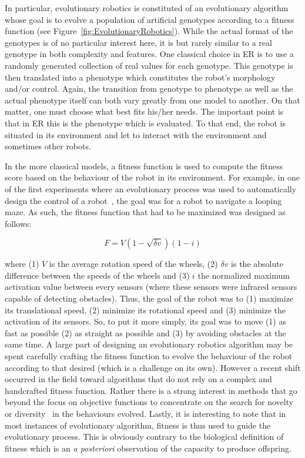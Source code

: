     In particular, evolutionary robotics is constituted of an evolutionary algorithm whose goal is to evolve a population of artificial genotypes according to a fitness function (see Figure~\ref{fig:EvolutionaryRobotics}). While the actual format of the genotypes is of no particular interest here, it is but rarely similar to a real genotype in both complexity and features. One classical choice in ER is to use a randomly generated collection of real values for each genotype. This genotype is then translated into a phenotype which constitutes the robot's morphology and/or control. Again, the transition from genotype to phenotype as well as the actual phenotype itself can both vary greatly from one model to another. On that matter, one must choose what best fits his/her needs. The important point is that in ER this is the phenotype which is evaluated. To that end, the robot is situated in its environment and let to interact with the environment and sometimes other robots. 

    
    In the more classical models, a fitness function is used to compute the fitness score based on the behaviour of the robot in its environment. For example, in one of the first experiments where an evolutionary process was used to automatically design the control of a robot~\parencite{Floreano1994}, the goal was for a robot to navigate a looping maze. As such, the fitness function that had to be maximized was designed as follows:

    \[
      F = V(1-\sqrt{\delta v})(1-i)
    \]

    where (1) $V$ is the average rotation speed of the wheels, (2) $\delta v$ is the absolute difference between the speeds of the wheels and (3) $i$ the normalized maximum activation value between every sensors (where these sensors were infrared sensors capable of detecting obstacles). Thus, the goal of the robot was to (1) maximize its translational speed, (2) minimize its rotational speed and (3) minimize the activation of its sensors. So, to put it more simply, its goal was to move (1) as fast as possible (2) as straight as possible and (3) by avoiding obstacles at the same time. A large part of designing an evolutionary robotics algorithm may be spent carefully crafting the fitness function to evolve the behaviour of the robot according to that desired (which is a challenge on its own). However a recent shift occurred in the field toward algorithms that do not rely on a complex and handcrafted fitness function. Rather there is a strong interest in methods that go beyond the focus on objective functions to concentrate on the search for novelty~\parencite{Lehman2008, Lehman2011} or diversity~\parencite{Mouret2012a} in the behaviours evolved. Lastly, it is interesting to note that in most instances of evolutionary algorithm, fitness is thus used to guide the evolutionary process. This is obviously contrary to the biological definition of fitness which is an \emph{a posteriori} observation of the capacity to produce offspring. 

